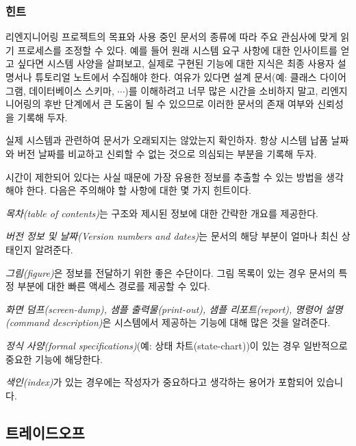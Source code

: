 \documentclass[a4paper,10pt,twoside]{book}
\begin{document}
\subsubsection*{힌트}

리엔지니어링 프로젝트의 목표와 사용 중인 문서의 종류에 따라 주요 관심사에 맞게 읽기 프로세스를 조정할 수 있다. 예를 들어 원래 시스템 요구 사항에 대한 인사이트를 얻고 싶다면 시스템 사양을 살펴보고, 실제로 구현된 기능에 대한 지식은 최종 사용자 설명서나 튜토리얼 노트에서 수집해야 한다. 여유가 있다면 설계 문서(예: 클래스 다이어그램, 데이터베이스 스키마, $\cdots$)를 이해하려고 너무 많은 시간을 소비하지 말고, 리엔지니어링의 후반 단계에서 큰 도움이 될 수 있으므로 이러한 문서의 존재 여부와 신뢰성을 기록해 두자. 

실제 시스템과 관련하여 문서가 오래되지는 않았는지 확인하자. 항상 시스템 납품 날짜와 버전 날짜를 비교하고 신뢰할 수 없는 것으로 의심되는 부분을 기록해 두자. 

시간이 제한되어 있다는 사실 때문에 가장 유용한 정보를 추출할 수 있는 방법을 생각해야 한다. 다음은 주의해야 할 사항에 대한 몇 가지 힌트이다.

\begin{bulletlist}
  \item \emph{목차(table of contents)}는 구조와 제시된 정보에 대한 간략한 개요를 제공한다.

  \item \emph{버전 정보 및 날짜(Version numbers and dates)}는 문서의 해당 부분이 얼마나 최신 상태인지 알려준다.

  \item \emph{그림(figure)}은 정보를 전달하기 위한 좋은 수단이다. 그림 목록이 있는 경우 문서의 특정 부분에 대한 빠른 액세스 경로를 제공할 수 있다.

  \item \emph{화면 덤프(screen-dump), 샘플 출력물(print-out), 샘플 리포트(report), 명령어 설명(command description)}은 시스템에서 제공하는 기능에 대해 많은 것을 알려준다.

  \item \emph{정식 사양(formal specifications)}(예: 상태 차트(state-chart))이 있는 경우 일반적으로 중요한 기능에 해당한다.

  \item \emph{색인(index)}가 있는 경우에는 작성자가 중요하다고 생각하는 용어가 포함되어 있습니다.
\end{bulletlist}

\subsection*{트레이드오프}
\end{document}
